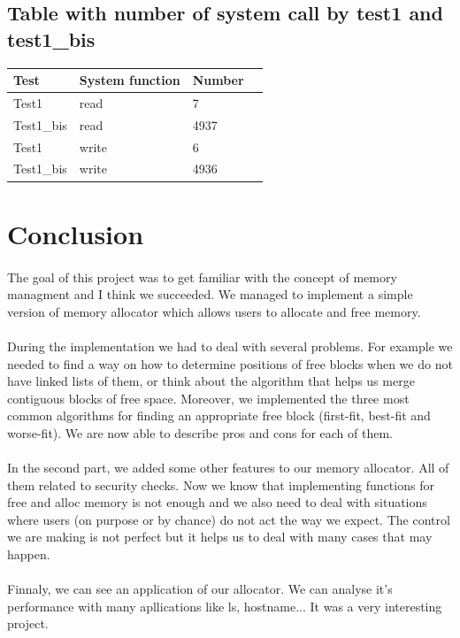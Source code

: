 \documentclass[a4paper,10pt]{article}
\begin{document}
\subsection{Table with number of system call by test1 and test1\_bis}
\begin{tabular}{|R{2cm}|C{2cm}|L{2cm}|L{2cm}|}
\hline {}Test & System function & Number\\
\hline  Test1 & read & 7 \\
\hline  Test1\_bis  & read & 4937 \\
\hline  Test1 & write & 6 \\
\hline  Test1\_bis  & write & 4936 \\
\hline 
\end{tabular}


\section{Conclusion}
\paragraph{}
The goal of this project was to get familiar with the concept of memory 
managment and I think we succeeded. We managed to implement a simple 
version of memory allocator which allows users to allocate and free memory.
\paragraph{} 
During the implementation we had to deal with several problems. For 
example we needed to find a way on how to determine positions of free 
blocks when we do not have linked lists of them, or think about the 
algorithm that helps us merge contiguous blocks of free space. Moreover, 
we implemented the three most common algorithms for finding an appropriate 
free block (first-fit, best-fit and worse-fit). We are now able to describe 
pros and cons for each of them.
\paragraph{}
In the second part, we added some other features to our memory allocator. 
All of them related to security checks. Now we know that implementing 
functions for free and alloc memory is not enough and we also need 
to deal with situations where users (on purpose or by chance) do not act the 
way we expect. The control we are making is not perfect but it helps 
us to deal with many cases that may happen.

\paragraph{}
Finnaly, we can see an application of our allocator. We can analyse it's
performance with many apllications like ls, hostname... It was a very 
interesting project.

 
\end{document}
